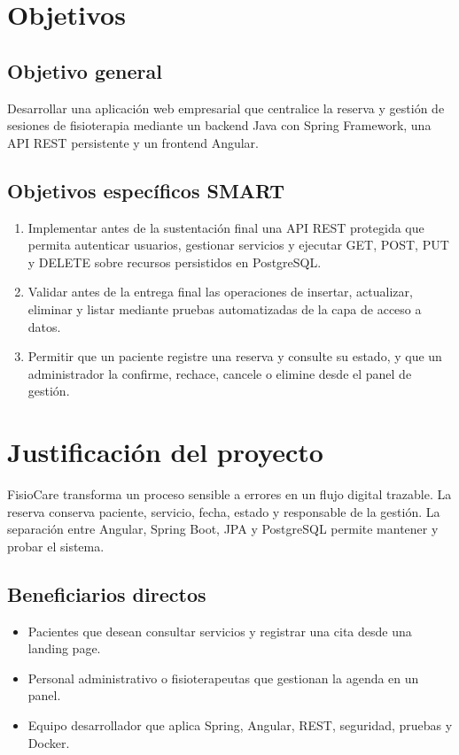 \documentclass[12pt,a4paper,oneside]{report}
\begin{document}
\section{Objetivos}
\subsection{Objetivo general}
Desarrollar una aplicación web empresarial que centralice la reserva y gestión de sesiones de fisioterapia mediante un backend Java con Spring Framework, una API REST persistente y un frontend Angular.

\subsection{Objetivos específicos SMART}
\begin{enumerate}
\item Implementar antes de la sustentación final una API REST protegida que permita autenticar usuarios, gestionar servicios y ejecutar GET, POST, PUT y DELETE sobre recursos persistidos en PostgreSQL.
\item Validar antes de la entrega final las operaciones de insertar, actualizar, eliminar y listar mediante pruebas automatizadas de la capa de acceso a datos.
\item Permitir que un paciente registre una reserva y consulte su estado, y que un administrador la confirme, rechace, cancele o elimine desde el panel de gestión.
\end{enumerate}

\section{Justificación del proyecto}
FisioCare transforma un proceso sensible a errores en un flujo digital trazable. La reserva conserva paciente, servicio, fecha, estado y responsable de la gestión. La separación entre Angular, Spring Boot, JPA y PostgreSQL permite mantener y probar el sistema.

\subsection{Beneficiarios directos}
\begin{itemize}
\item Pacientes que desean consultar servicios y registrar una cita desde una landing page.
\item Personal administrativo o fisioterapeutas que gestionan la agenda en un panel.
\item Equipo desarrollador que aplica Spring, Angular, REST, seguridad, pruebas y Docker.
\end{itemize}
\end{document}

